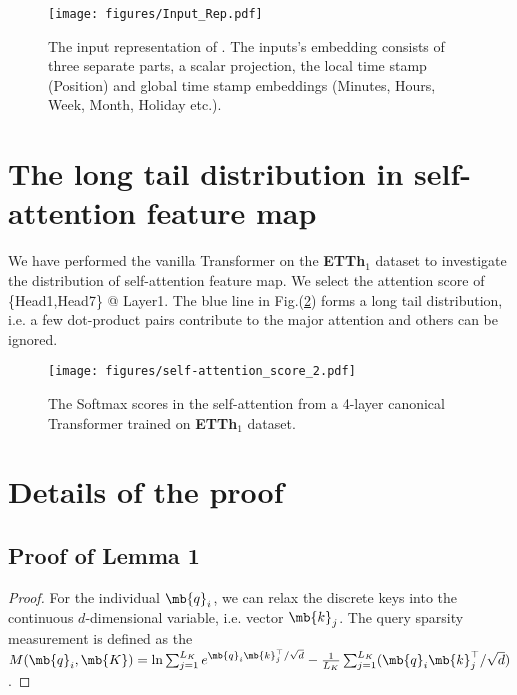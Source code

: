 \begin{appendices}
\begin{figure}[h]
  \centering
  \texttt{[image: figures/Input\_Rep.pdf]}
  \caption{The input representation of \mn. The inputs's embedding consists of three separate parts, a scalar projection, the local time stamp (Position) and global time stamp embeddings (Minutes, Hours, Week, Month, Holiday etc.).}
  \label{fig:method.embed}
\end{figure}

\section{The long tail distribution in self-attention feature map}
We have performed the vanilla Transformer on the \textbf{ETTh$_1$} dataset to investigate the distribution of self-attention feature map. We select the attention score of \{Head1,Head7\} @ Layer1. The blue line in Fig.(\ref{fig:method.self-attention.score}) forms a long tail distribution, i.e. a few dot-product pairs contribute to the major attention and others can be ignored.
\label{sec:appendix.longtail}
\begin{figure}[ht]
  \centering
  \texttt{[image: figures/self-attention\_score\_2.pdf]}
  \caption{The Softmax scores in the self-attention from a 4-layer canonical Transformer trained on \textbf{ETTh$_1$} dataset.}
  \label{fig:method.self-attention.score}
\end{figure}

\section{Details of the proof}
\subsection{Proof of Lemma 1}
\label{sec:appendix.proof1}
\begin{proof}
For the individual $\mb{q}_i$, we can relax the discrete keys into the continuous $d$-dimensional variable, i.e. vector $\mb{k}_j$. The query sparsity measurement is defined as the $M(\mb{q}_i, \mb{K}) = \ln \sum_{j=1}^{L_K} e^{{\mb{q}_i\mb{k}_j^{\top}}/{\sqrt{d}}} - \frac{1}{L_K} \sum_{j=1}^{L_K} ({\mb{q}_i\mb{k}_j^{\top}}/{\sqrt{d}})$.


\end{proof}
\end{appendices}
